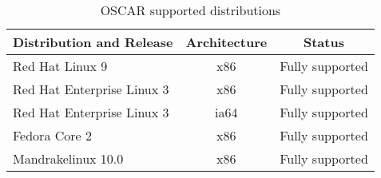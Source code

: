 %
%
%

\begin{table}[htbp]
  \begin{center}
    \begin{tabular}{|l|c|p{3in}|}
      \hline
      \multicolumn{1}{|c|}{Distribution and Release} &
      \multicolumn{1}{|c|}{Architecture} &
      \multicolumn{1}{|c|}{Status} \\
      \hline
      \hline
      Red Hat Linux 9 & x86 &Fully supported \\
%
      Red Hat Enterprise Linux 3 & x86 & Fully supported \\
%
      Red Hat Enterprise Linux 3 & ia64 & Fully supported \\
%
\hline
%
      Fedora Core 2 & x86 & Fully supported \\
%
\hline
%
      Mandrakelinux 10.0 & x86 & Fully supported \\
%
\hline
%
    \end{tabular}
    \caption{OSCAR supported distributions}
    \label{tab:oscar-distro-support}
  \end{center}
\end{table}
